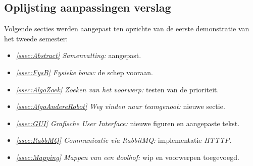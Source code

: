 \documentclass[tt2]{penoverslag}
\begin{document}
\subsection{Oplijsting aanpassingen verslag} %
\label{Assec:aanp1}
Volgende secties werden aangepast ten opzichte van de eerste demonstratie van het tweede semester:

\begin{itemize}
\item \textit{\ref{ssec:Abstract} Samenvatting:} aangepast.
\item \textit{\ref{ssec:FysB} Fysieke bouw:} de schep vooraan.
\item \textit{\ref{ssec:AlgoZoek} Zoeken van het voorwerp:} testen van de prioriteit.
\item \textit{\ref{ssec:AlgoAndereRobot} Weg vinden naar teamgenoot:} nieuwe sectie.
\item \textit{\ref{ssec:GUI} Grafische User Interface:} nieuwe figuren en aangepaste tekst.
\item \textit{\ref{ssec:RabbMQ} Communicatie via RabbitMQ:} implementatie \textit{HTTTP}.
\item \textit{\ref{ssec:Mapping} Mappen van een doolhof:} wip en voorwerpen toegevoegd.
\end{itemize}


%
%
%
%
%
%
%
\end{document}
